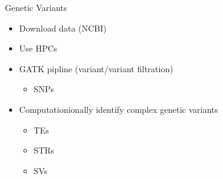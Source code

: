 \documentclass[t,10pt]{beamer}
\begin{document}
\begin{frame}[label={sec:orgheadline36}]{Genetic Variants}
\begin{itemize}[<+->]
\item Download data (NCBI)
\item Use HPCs
\item GATK pipline (variant/variant filtration)
\begin{itemize}
\item SNPs
\end{itemize}
\item Computationionally identify complex genetic variants
\begin{itemize}
\item TEs
\item STRs
\item SVs
\end{itemize}
\end{itemize}
\end{frame}
\end{document}
